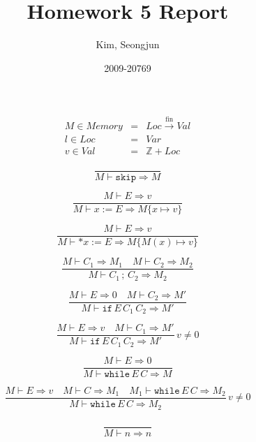 \documentclass{article}
\begin{document}
\title{Homework 5 Report}
\author{Kim, Seongjun}
\date{2009-20769}
\maketitle

\begin{eqnarray*}
  M \in Memory & = & Loc \stackrel{\textrm{fin}}{\to} Val \\
  l \in Loc & = & Var \\
  v \in Val & = & \mathbb{Z} + Loc
\end{eqnarray*}

\begin{displaymath}
  \frac{ }{M \vdash \texttt{skip} \Rightarrow M}
\end{displaymath}

\begin{displaymath}
  \frac{M \vdash E \Rightarrow v}{M \vdash x := E \Rightarrow M\{x \mapsto v\}}
\end{displaymath}

\begin{displaymath}
  \frac{M \vdash E \Rightarrow v}{M \vdash *x := E \Rightarrow M\{M(x) \mapsto v\}}
\end{displaymath}

\begin{displaymath}
  \frac{M \vdash {C}_{1} \Rightarrow {M}_{1} \quad M \vdash {C}_{2} \Rightarrow {M}_{2}}{M \vdash {C}_{1} \, ; \, {C}_{2} \Rightarrow {M}_{2}}
\end{displaymath}

\begin{displaymath}
  \frac{M \vdash E \Rightarrow 0 \quad M \vdash {C}_{2} \Rightarrow M'}{M \vdash \texttt{if} \, E \, {C}_{1} \, {C}_{2} \Rightarrow M'}
\end{displaymath}

\begin{displaymath}
  \frac{M \vdash E \Rightarrow v \quad M \vdash {C}_{1} \Rightarrow M'}{M \vdash \texttt{if} \, E \, {C}_{1} \, {C}_{2} \Rightarrow M'} \, v \neq 0
\end{displaymath}

\begin{displaymath}
  \frac{M \vdash E \Rightarrow 0}{M \vdash \texttt{while} \, E \, C \Rightarrow M}
\end{displaymath}

\begin{displaymath}
  \frac{M \vdash E \Rightarrow v \quad M \vdash C \Rightarrow {M}_{1} \quad {M}_{1} \vdash \texttt{while} \, E \, C \Rightarrow {M}_{2}}{M \vdash \texttt{while} \, E \, C \Rightarrow {M}_{2}} \, v \neq 0
\end{displaymath}
\\
\begin{displaymath}
  \frac{ }{M \vdash n \Rightarrow n}
\end{displaymath}
\end{document}
